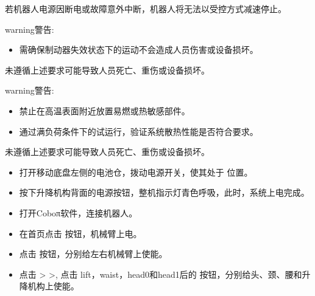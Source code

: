 \documentclass[a4paper,11pt,english,openany,oneside]{sphinxmanual}
\begin{document}
\sphinxAtStartPar
若机器人电源因断电或故障意外中断，机器人将无法以受控方式减速停止。

\begin{sphinxadmonition}{warning}{警告:}
\sphinxAtStartPar
{}
\begin{itemize}
\item {} 
\sphinxAtStartPar
需确保制动器失效状态下的运动不会造成人员伤害或设备损坏。

\end{itemize}

\sphinxAtStartPar
未遵循上述要求可能导致人员死亡、重伤或设备损坏。
\end{sphinxadmonition}

\begin{sphinxadmonition}{warning}{警告:}
\sphinxAtStartPar
{}
\begin{itemize}
\item {} 
\sphinxAtStartPar
禁止在高温表面附近放置易燃或热敏感部件。

\item {} 
\sphinxAtStartPar
通过满负荷条件下的试运行，验证系统散热性能是否符合要求。

\end{itemize}

\sphinxAtStartPar
未遵循上述要求可能导致人员死亡、重伤或设备损坏。
\end{sphinxadmonition}

\sphinxAtStartPar
{}
\begin{itemize}
\item {} 
\sphinxAtStartPar
打开移动底盘左侧的电池仓，拨动电源开关，使其处于  位置。

\item {} 
\sphinxAtStartPar
按下升降机构背面的电源按钮，整机指示灯青色呼吸，此时，系统上电完成。

\item {} 
\sphinxAtStartPar
打开Coboπ软件，连接机器人。

\item {} 
\sphinxAtStartPar
在首页点击  按钮，机械臂上电。

\item {} 
\sphinxAtStartPar
点击  按钮，分别给左右机械臂上使能。

\item {} 
\sphinxAtStartPar
点击  >  >, 点击 lift，waist，head0和head1后的  按钮，分别给头、颈、腰和升降机构上使能。

\end{itemize}
\end{document}
